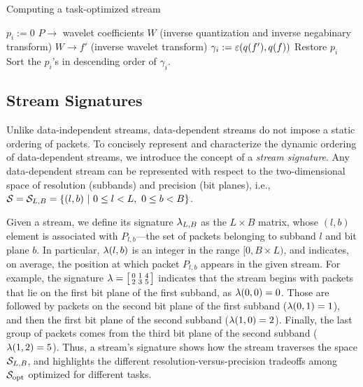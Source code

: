 \begin{algorithm}[h]
  \caption{Computing a task-optimized stream}
  \begin{algorithmic}[1]
			\State $p_i := 0$
      \State $P \rightarrow$ wavelet coefficients $W$ (inverse quantization and inverse negabinary transform)
			\State $W \rightarrow f'$ (inverse wavelet transform)
			\State $\gamma_i := \err(q(f'),q(f))$			
			\State Restore $p_i$
		\EndFor
		\State Sort the $p_i$'s in descending order of $\gamma_i$.
	\end{algorithmic}
	\label{alg:greedy}
\end{algorithm}

\subsection{Stream Signatures} \label{sec:stream-signature}

Unlike data-independent streams, data-dependent streams do not impose a static ordering of packets.
To concisely represent and characterize the dynamic ordering of data-dependent streams, we introduce
the concept of a \emph{stream signature}.  Any data-dependent stream can be represented with respect
to the two-dimensional space of resolution (subbands) and precision (bit planes), i.e., \mbox{$\strm
= \strm_{L,B}=\{(l,b)\ |\ 0\leq l < L,\ 0\leq b < B\}$.} 

Given a stream, we define its signature $\sgn_{L,B}$ as the $L \times B$ matrix, whose $(l,b)$
element is associated with $P_{l,b}$---the set of packets belonging to subband $l$ and bit plane
$b$. In particular, $\sgn(l,b)$ is an integer in the range $[0, B\times L)$, and indicates, on
average, the position at which packet $P_{l,b}$ appears in the given stream. For example, the
signature $\sgn=\bigl[ \begin{smallmatrix}0 & 1 & 4\\ 2 & 3 & 5\end{smallmatrix}\bigr]$ indicates
that the stream begins with packets that lie on the first bit plane of the first subband, as
$\sgn(0,0)=0$. Those are followed by packets on the second bit plane of the first subband
($\sgn(0,1)=1$), and then the first bit plane of the second subband ($\sgn(1,0)=2$). Finally, the
last group of packets comes from the third bit plane of the second subband ($\sgn(1,2)=5$). Thus, a
stream's signature shows how the stream traverses the space $\strm_{L,B}$, and highlights the
different resolution-versus-precision tradeoffs among $\sopt$ optimized for different tasks.

